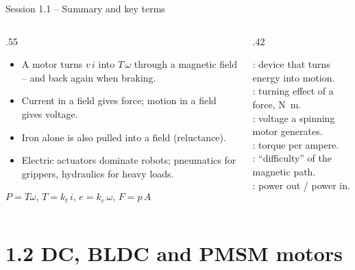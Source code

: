\documentclass[aspectratio=169,10pt]{beamer}
\begin{document}
\begin{frame}{Session 1.1 -- Summary and key terms}
\begin{columns}[T]
\begin{column}{.55\textwidth}
\small
\begin{itemize}
\item A motor turns $v\,i$ into $T\,\omega$ through a magnetic field -- and back again when braking.
\item Current in a field gives force; motion in a field gives voltage.
\item Iron alone is also pulled into a field (reluctance).
\item Electric actuators dominate robots; pneumatics for grippers, hydraulics for heavy loads.
\end{itemize}
\begin{keybox}[Remember]
$P=T\omega$, \quad $T=k_t\,i$, \quad $e=k_e\,\omega$, \quad $F=p\,A$
\end{keybox}
\end{column}
\begin{column}{.42\textwidth}
\begin{defbox}
\small
{}: device that turns energy into motion.\\
: turning effect of a force, \si{\newton\metre}.\\
: voltage a spinning motor generates.\\
: torque per ampere.\\
: ``difficulty'' of the magnetic path.\\
: power out / power in.
\end{defbox}
\end{column}
\end{columns}
\end{frame}

\section{1.2 DC, BLDC and PMSM motors}
\end{document}
